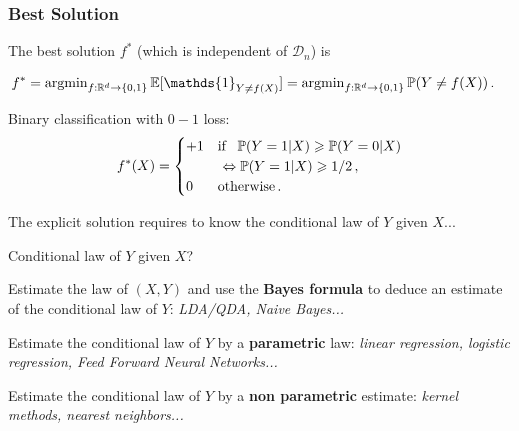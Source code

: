\documentclass[xcolor={usenames,dvipsnames}]{beamer}
\begin{document}
\begin{frame}\frametitle{Best Solution}

\alert{The best solution} $f^*$ (which is independent of $\mathcal{D}_n$) is 

\begin{align*}
f^* &%
= \argmin_{f:\mathbb{R}^d\to\{0,1\}}
	\E[\mathds{1}_{Y\neq f(X)}] =  \argmin_{f:\mathbb{R}^d\to\{0,1\}}
	\mathbb{P}(Y\neq f(X))\,.
\end{align*}

\vspace{.3cm}


\alert{Binary classification} with $0-1$ loss: 
			\begin{align*}
			f^*(X) = \begin{cases}
			+1 & \text{if  \, $\P(Y=1|X) \geqslant \P(Y=0| X)$}\\
			& \text{ $\Leftrightarrow \P(Y=1|X) \geqslant 1/2$}\,,\\
			0  & \text{otherwise}\,.
			\end{cases}
			\end{align*}

\vspace{.3cm}

The explicit solution requires to \alert{know the conditional law of $Y$ given $X$}...

\end{frame}

\begin{frame}{Conditional law of $Y$ given $X$?}


    
     Estimate the law of $(X,Y)$
      and use the \textbf{Bayes formula} to deduce an estimate of
      the conditional law of $Y$: \emph{LDA/QDA, Naive Bayes...}

\vspace{.5cm}

    
     Estimate the conditional law of
      $Y$ by a \textbf{parametric} law: \emph{linear regression, logistic regression, Feed Forward Neural Networks...}

\vspace{.5cm}

    
     Estimate the conditional  law of
      $Y$ by a \textbf{non parametric} estimate: \emph{kernel
        methods, nearest neighbors...}

 
\end{frame}
\end{document}
